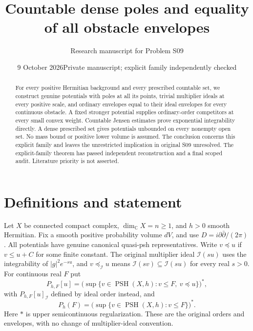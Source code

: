 \documentclass[11pt]{article}
\title{Countable dense poles and equality of all obstacle envelopes}
\author{Research manuscript for Problem S09}
\date{9 October 2026\quad Private manuscript; explicit family independently checked}
\theoremstyle{remark}\newtheorem{remark}[theorem]{Remark}
\newcommand{\ddc}{D}
\newcommand{\PSH}{\operatorname{PSH}}
\begin{document}
\maketitle
\begin{abstract}
For every positive Hermitian background and every prescribed countable
set, we construct genuine potentials with poles at all its points, trivial
multiplier ideals at every positive scale, and ordinary envelopes equal
to their ideal envelopes for every continuous obstacle. A fixed stronger
potential supplies ordinary-order competitors at every small convex
weight. Countable Jensen estimates prove exponential integrability
directly. A dense prescribed set gives potentials unbounded on every
nonempty open set. No mass bound or positive lower volume is assumed.
The conclusion concerns this explicit family and leaves the unrestricted
implication in original S09 unresolved. The explicit-family theorem has
passed independent reconstruction and a final scoped audit. Literature
priority is not asserted.
\end{abstract}

\section{Definitions and statement}
Let $X$ be connected compact complex, $\dim_{\mathbb C}X=n\geq1$, and
$h>0$ smooth Hermitian. Fix a smooth positive probability volume $dV$,
and use $\ddc=i\partial\bar\partial/(2\pi)$. All potentials have genuine
canonical quasi-psh representatives. Write $v\preceq u$ if $v\leq u+C$
for some finite constant. The original multiplier ideal $\mathcal I(su)$
uses the integrability of $|g|^2e^{-su}$, and $v\preceq_{\mathcal I}u$
means $\mathcal I(sv)\subseteq\mathcal I(su)$ for every real $s>0$.
For continuous real $F$ put
\[
 P_{h,F}[u]=\bigl(\sup\{v\in\PSH(X,h):v\leq F,
                                     \ v\preceq u\}\bigr)^*,
\]
with $P_{h,F}[u]_{\mathcal I}$ defined by ideal order instead, and
\[
 P_h(F)=\bigl(\sup\{v\in\PSH(X,h):v\leq F\}\bigr)^*.
\]
Here $*$ is upper semicontinuous regularization. These are the original
orders and envelopes, with no change of multiplier-ideal convention.
\end{document}
